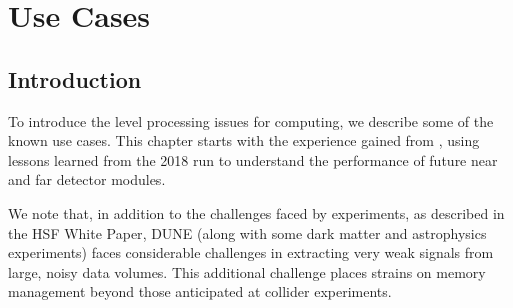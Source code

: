 \documentclass[../main-v1.tex]{subfiles}
\begin{document}
\chapter{Use Cases }
\label{ch:use}
\newcommand{\ignore}[1]{{}}


\section{Introduction }

To introduce the  level processing issues for  computing, we describe some of the known use cases.  %
This chapter starts with  the experience gained from  ,  using lessons learned from the 2018 run to understand the performance of future near and far detector modules. 

We note that, in addition to the challenges faced by  experiments, as described in the HSF White Paper\cite{HEPSoftwareFoundation:2017ggl}, DUNE (along with some dark matter and astrophysics experiments) faces considerable challenges in extracting very weak signals from large, noisy data volumes.  This additional challenge places strains on memory management beyond those anticipated at collider experiments. 



\end{document}
